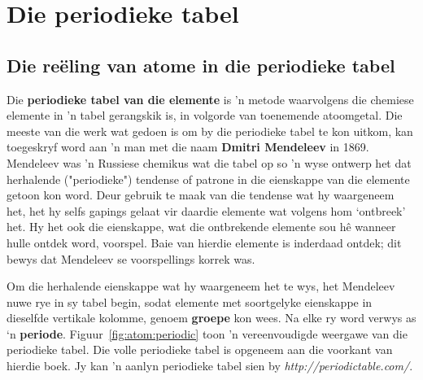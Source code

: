          \chapter{Die periodieke tabel}
    \setcounter{figure}{1}
    \setcounter{subfigure}{1}
 \label{m38760*cid9}
            \section{Die re\"{e}ling van atome in die periodieke tabel}
            \nopagebreak

      \label{m38760*id261491}Die \textbf{periodieke tabel van die elemente} is 'n metode waarvolgens die chemiese elemente in 'n tabel gerangskik is,
in volgorde van toenemende atoomgetal. Die meeste van die werk wat gedoen is om by die periodieke tabel te kon uitkom, kan toegeskryf word aan 'n man met die naam \textbf{Dmitri Mendeleev} in 1869. Mendeleev was 'n Russiese chemikus wat die tabel op so 'n wyse ontwerp het dat herhalende ("periodieke") tendense of patrone in die eienskappe van die elemente getoon kon word. Deur gebruik te maak van die tendense wat hy waargeneem het, het hy selfs gapings gelaat vir daardie elemente wat volgens hom ‘ontbreek’ het. Hy het ook die eienskappe, wat die ontbrekende elemente sou h\^{e} wanneer hulle ontdek word, voorspel. Baie van hierdie elemente is inderdaad ontdek; dit bewys dat Mendeleev se voorspellings korrek was.\par 
      \label{m38760*id261511}Om die herhalende eienskappe wat hy waargeneem het te wys, het Mendeleev nuwe rye in sy tabel begin, 
sodat elemente met soortgelyke eienskappe in dieselfde vertikale kolomme, genoem \textbf{groepe} kon wees. Na elke ry word verwys as ‘n \textbf{periode}. Figuur~\ref{fig:atom:periodic} toon 'n vereenvoudigde weergawe van die periodieke tabel. Die
volle periodieke tabel is opgeneem aan die voorkant van hierdie boek. Jy kan 'n aanlyn periodieke tabel sien by \textsl{http://periodictable.com/}. \par 
    \setcounter{subfigure}{0}

